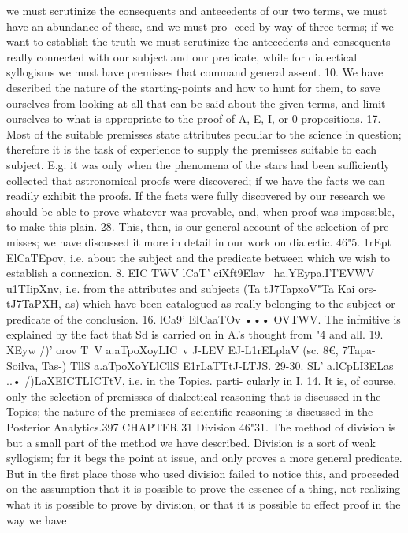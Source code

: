 {{{{{{{{{{{{{{{{{{{{{{{{we must scrutinize the consequents and antecedents of our two
terms, we must have an abundance of these, and we must pro-
ceed by way of three terms; if we want to establish the truth we
must scrutinize the antecedents and consequents really connected
with our subject and our predicate, while for dialectical syllogisms
we must have premisses that command general assent.
10. We have described the nature of the starting-points and
how to hunt for them, to save ourselves from looking at all that
can be said about the given terms, and limit ourselves to what is
appropriate to the proof of A, E, I, or 0 propositions.
17. Most of the suitable premisses state attributes peculiar to
the science in question; therefore it is the task of experience to
supply the premisses suitable to each subject. E.g. it was only
when the phenomena of the stars had been sufficiently collected
that astronomical proofs were discovered; if we have the facts we
can readily exhibit the proofs. If the facts were fully discovered
by our research we should be able to prove whatever was provable,
and, when proof was impossible, to make this plain.
28. This, then, is our general account of the selection of pre-
misses; we have discussed it more in detail in our work on
dialectic.
46"5. 1rEpt ElCaTEpov, i.e. about the subject and the predicate
between which we wish to establish a connexion.
8. EIC TWV lCaT' ciXft9Elav ~ha.YEypa.I'I'EVWV u1TIipXnv, i.e. from the
attributes and subjects (Ta tJ7TapxoV"Ta Kai ors- tJ7TaPXH, as) which
have been catalogued as really belonging to the subject or
predicate of the conclusion.
16. lCa9' ElCaaTOv ••• OVTWV. The infmitive is explained by the
fact that Sd is carried on in A.'s thought from "4 and all.
19. XEyw /)' orov T~V a.aTpoXoyLIC~v J-LEV EJ-L1rELplaV (sc. 8€, 7Tapa-
Soilva, Tas-) TllS a.aTpoXoYLlCllS E1rLaTTtJ-LTJS.
29-30. SL' a.lCpLI3ELas ..• /)LaXEICTLICTtV, i.e. in the Topics. parti-
cularly in I. 14. It is, of course, only the selection of premisses
of dialectical reasoning that is discussed in the Topics; the nature
of the premisses of scientific reasoning is discussed in the Posterior
Analytics.397
CHAPTER 31
Division
46"31. The method of division is but a small part of the method
we have described. Division is a sort of weak syllogism; for it
begs the point at issue, and only proves a more general predicate.
But in the first place those who used division failed to notice this,
and proceeded on the assumption that it is possible to prove the
essence of a thing, not realizing what it is possible to prove by
division, or that it is possible to effect proof in the way we have
}}}}}}}}}}}}}}}}}}}}}}}}
